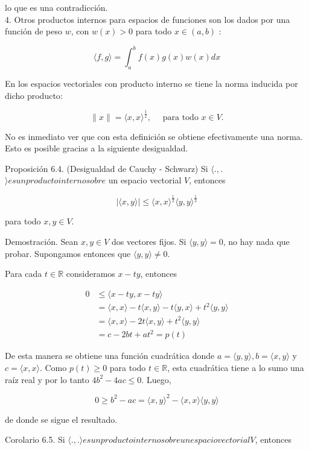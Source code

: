 \documentclass[10pt]{book}
\begin{document}
lo que es una contradicción.\\
4. Otros productos internos para espacios de funciones son los dados por una función de peso $w$, con $w(x)>0$ para todo $x \in(a, b)$ :

$$
\langle f, g\rangle=\int_{a}^{b} f(x) g(x) w(x) d x
$$

En los espacios vectoriales con producto interno se tiene la norma inducida por dicho producto:

$$
\|x\|=\langle x, x\rangle^{\frac{1}{2}}, \quad \text { para todo } x \in V .
$$

No es inmediato ver que con esta definición se obtiene efectivamente una norma. Esto es posible gracias a la siguiente desigualdad.

Proposición 6.4. (Desigualdad de Cauchy - Schwarz) Si $\langle.,$.$\rangle es un producto interno sobre$ un espacio vectorial $V$, entonces

$$
|\langle x, y\rangle| \leq\langle x, x\rangle^{\frac{1}{2}}\langle y, y\rangle^{\frac{1}{2}}
$$

para todo $x, y \in V$.

Demostración. Sean $x, y \in V$ dos vectores fijos. Si $\langle y, y\rangle=0$, no hay nada que probar. Supongamos entonces que $\langle y, y\rangle \neq 0$.

Para cada $t \in \mathbb{R}$ consideramos $x-t y$, entonces

$$
\begin{aligned}
0 & \leq\langle x-t y, x-t y\rangle \\
& =\langle x, x\rangle-t\langle x, y\rangle-t\langle y, x\rangle+t^{2}\langle y, y\rangle \\
& =\langle x, x\rangle-2 t\langle x, y\rangle+t^{2}\langle y, y\rangle \\
& =c-2 b t+a t^{2}=p(t)
\end{aligned}
$$

De esta manera se obtiene una función cuadrática donde $a=\langle y, y\rangle, b=\langle x, y\rangle$ y $c=\langle x, x\rangle$. Como $p(t) \geq 0$ para todo $t \in \mathbb{R}$, esta cuadrática tiene a lo sumo una raíz real y por lo tanto $4 b^{2}-4 a c \leq 0$. Luego,

$$
0 \geq b^{2}-a c=\langle x, y\rangle^{2}-\langle x, x\rangle\langle y, y\rangle
$$

de donde se sigue el resultado.

Corolario 6.5. Si $\langle.,$.$\rangle es un producto interno sobre un espacio vectorial V$, entonces
\end{document}
